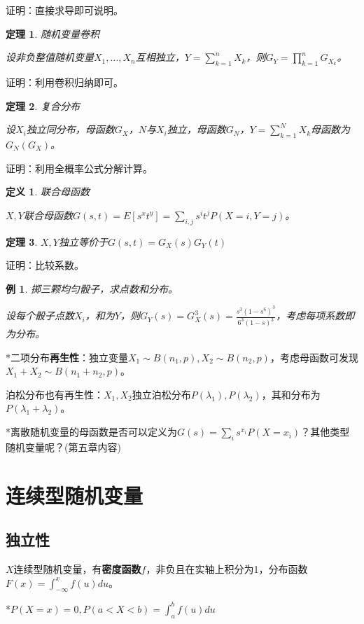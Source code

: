 \documentclass[a4paper,UTF8,fontset=windows]{ctexart}
\newtheorem{thm}{定理}[section]
\newtheorem{exmp}{例}[section]
\newtheorem{defi}{定义}[section]
\begin{document}
证明：直接求导即可说明。

\begin{thm} 随机变量卷积

设非负整值随机变量$X_1,\dots,X_n$互相独立，$Y=\sum_{k=1}^nX_k$，则$G_Y=\prod_{k=1}^nG_{X_k}$。
\end{thm}

证明：利用卷积归纳即可。

\begin{thm} 复合分布
	
设$X_i$独立同分布，母函数$G_X$，$N$与$X_i$独立，母函数$G_N$，$Y=\sum_{k=1}^NX_k$母函数为$G_N(G_X)$。
\end{thm}

证明：利用全概率公式分解计算。

\begin{defi} 联合母函数

$X,Y$联合母函数$G(s,t)=E[s^xt^y]=\sum_{i,j}s^it^jP(X=i,Y=j)$。
\end{defi}

\begin{thm} $X,Y$独立等价于$G(s,t)=G_X(s)G_Y(t)$
\end{thm}

证明：比较系数。

\begin{exmp} 掷三颗均匀骰子，求点数和分布。

设每个骰子点数$X_i$，和为$Y$，则$G_Y(s)=G_X^3(s)=\frac{s^3(1-s^6)^3}{6^3(1-s)^3}$，考虑每项系数即为分布。
\end{exmp}

*二项分布\textbf{再生性}：独立变量$X_1\sim B(n_1,p),X_2\sim B(n_2,p)$，考虑母函数可发现$X_1+X_2\sim B(n_1+n_2,p)$。

泊松分布也有再生性：$X_1,X_2$独立泊松分布$P(\lambda_1),P(\lambda_2)$，其和分布为$P(\lambda_1+\lambda_2)$。

*离散随机变量的母函数是否可以定义为$G(s)=\sum_is^{x_i}P(X=x_i)$？其他类型随机变量呢？(第五章内容)

\section{连续型随机变量}
\subsection{独立性}
$X$连续型随机变量，有\textbf{密度函数}$f$，非负且在实轴上积分为1，分布函数$F(x)=\int_{-\infty}^xf(u)du$。

*$P(X=x)=0,P(a<X<b)=\int_a^bf(u)du$
\end{document}
